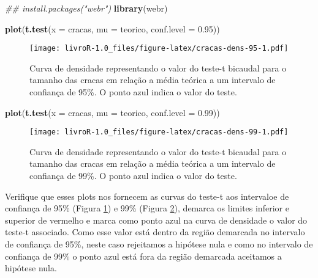 \documentclass[titlepage, oneside, openany, a4paper]{book}
\newenvironment{Shaded}{\begin{snugshade}}{\end{snugshade}}
\newcommand{\CommentTok}[1]{\textcolor[rgb]{0.56,0.35,0.01}{\textit{#1}}}
\newcommand{\DataTypeTok}[1]{\textcolor[rgb]{0.13,0.29,0.53}{#1}}
\newcommand{\FloatTok}[1]{\textcolor[rgb]{0.00,0.00,0.81}{#1}}
\newcommand{\KeywordTok}[1]{\textcolor[rgb]{0.13,0.29,0.53}{\textbf{#1}}}
\newcommand{\NormalTok}[1]{#1}
\begin{document}
\begin{Shaded}
\begin{Highlighting}[]
\CommentTok{## install.packages("webr")}
\KeywordTok{library}\NormalTok{(webr)}
\end{Highlighting}
\end{Shaded}

\begin{Shaded}
\begin{Highlighting}[]
\KeywordTok{plot}\NormalTok{(}\KeywordTok{t.test}\NormalTok{(}\DataTypeTok{x =}\NormalTok{ cracas, }\DataTypeTok{mu =}\NormalTok{ teorico, }\DataTypeTok{conf.level =} \FloatTok{0.95}\NormalTok{))}
\end{Highlighting}
\end{Shaded}

\begin{figure}
\centering
\texttt{[image: livroR-1.0\_files/figure-latex/cracas-dens-95-1.pdf]}
\caption{\label{fig:cracas-dens-95}Curva de densidade representando o valor do teste-t bicaudal para o tamanho das cracas em relação a média teórica a um intervalo de confiança de 95\%. O ponto azul indica o valor do teste.}
\end{figure}

\begin{Shaded}
\begin{Highlighting}[]
\KeywordTok{plot}\NormalTok{(}\KeywordTok{t.test}\NormalTok{(}\DataTypeTok{x =}\NormalTok{ cracas, }\DataTypeTok{mu =}\NormalTok{ teorico, }\DataTypeTok{conf.level =} \FloatTok{0.99}\NormalTok{))}
\end{Highlighting}
\end{Shaded}

\begin{figure}
\centering
\texttt{[image: livroR-1.0\_files/figure-latex/cracas-dens-99-1.pdf]}
\caption{\label{fig:cracas-dens-99}Curva de densidade representando o valor do teste-t bicaudal para o tamanho das cracas em relação a média teórica a um intervalo de confiança de 99\%. O ponto azul indica o valor do teste.}
\end{figure}

Verifique que esses plots nos fornecem as curvas do teste-t aos intervaloe de confiança de 95\% (Figura \ref{fig:cracas-dens-95}) e 99\% (Figura \ref{fig:cracas-dens-99}), demarca os limites inferior e superior de vermelho e marca como ponto azul na curva de densidade o valor do teste-t associado. Como esse valor está dentro da região demarcada no intervalo de confiança de 95\%, neste caso rejeitamos a hipótese nula e como no intervalo de confiança de 99\% o ponto azul está fora da região demarcada aceitamos a hipótese nula.
\end{document}
